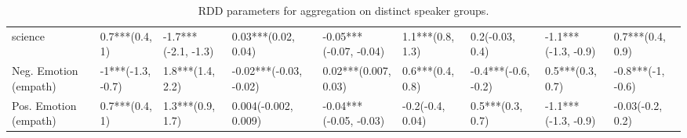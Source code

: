 \begin{table}[h]
\begin{adjustbox}{width=\linewidth, center}
\begin{tabular}{lllllllll}
	science               &       0.7***(0.4, 1) &  -1.7***(-2.1, -1.3) &      0.03***(0.02, 0.04) &  -0.05***(-0.07, -0.04) &     1.1***(0.8, 1.3) &      0.2(-0.03, 0.4) &  -1.1***(-1.3, -0.9) &     0.7***(0.4, 0.9) \\
	Neg. Emotion (empath) &    -1***(-1.3, -0.7) &     1.8***(1.4, 2.2) &   -0.02***(-0.03, -0.02) &    0.02***(0.007, 0.03) &     0.6***(0.4, 0.8) &  -0.4***(-0.6, -0.2) &     0.5***(0.3, 0.7) &    -0.8***(-1, -0.6) \\
	Pos. Emotion (empath) &       0.7***(0.4, 1) &     1.3***(0.9, 1.7) &     0.004(-0.002, 0.009) &  -0.04***(-0.05, -0.03) &     -0.2(-0.4, 0.04) &     0.5***(0.3, 0.7) &  -1.1***(-1.3, -0.9) &     -0.03(-0.2, 0.2) \\
	\bottomrule
	\end{tabular}
	
\end{adjustbox}
	\caption{RDD parameters for aggregation on distinct speaker groups.}
	\label{fig: Attributes_1}
\end{table}


